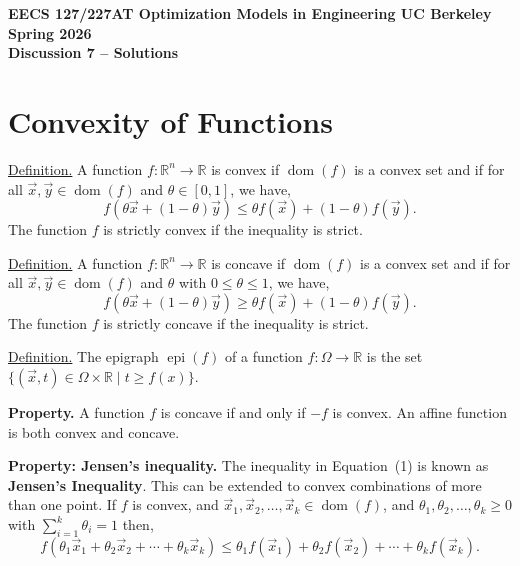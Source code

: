\documentclass[10pt]{article}
\newcommand{\RR}{\mathbb{R}}
\DeclareMathOperator{\dom}{dom}
\DeclareMathOperator{\epi}{epi}
\begin{document}
\begin{center}
    {\large\bfseries EECS 127/227AT \quad Optimization Models in Engineering \quad UC Berkeley \quad Spring 2026}\\[6pt]
    {\LARGE\bfseries Discussion 7 -- Solutions}
\end{center}

\section{Convexity of Functions}

\underline{Definition.} A function $f\colon \RR^n \to \RR$ is convex if $\dom(f)$ is a convex set and if for all $\vec{x}, \vec{y} \in \dom(f)$ and $\theta \in [0,1]$, we have,
\begin{equation}
    f(\theta \vec{x} + (1-\theta)\vec{y}) \leq \theta f(\vec{x}) + (1-\theta) f(\vec{y}).
\end{equation}
The function $f$ is strictly convex if the inequality is strict.

\underline{Definition.} A function $f\colon \RR^n \to \RR$ is concave if $\dom(f)$ is a convex set and if for all $\vec{x}, \vec{y} \in \dom(f)$ and $\theta$ with $0 \leq \theta \leq 1$, we have,
\begin{equation}
    f(\theta \vec{x} + (1-\theta)\vec{y}) \geq \theta f(\vec{x}) + (1-\theta) f(\vec{y}).
\end{equation}
The function $f$ is strictly concave if the inequality is strict.

\underline{Definition.} The epigraph $\epi(f)$ of a function $f\colon \Omega \to \RR$ is the set $\{(\vec{x}, t) \in \Omega \times \RR \mid t \geq f(x)\}$.

\textbf{Property.} A function $f$ is concave if and only if $-f$ is convex. An affine function is both convex and concave.

\textbf{Property: Jensen's inequality.} The inequality in Equation~(1) is known as \textbf{Jensen's Inequality}. This can be extended to convex combinations of more than one point. If $f$ is convex, and $\vec{x}_1, \vec{x}_2, \ldots, \vec{x}_k \in \dom(f)$, and $\theta_1, \theta_2, \ldots, \theta_k \geq 0$ with $\sum_{i=1}^{k} \theta_i = 1$ then,
\begin{equation}
    f(\theta_1 \vec{x}_1 + \theta_2 \vec{x}_2 + \cdots + \theta_k \vec{x}_k) \leq \theta_1 f(\vec{x}_1) + \theta_2 f(\vec{x}_2) + \cdots + \theta_k f(\vec{x}_k).
\end{equation}
\end{document}
